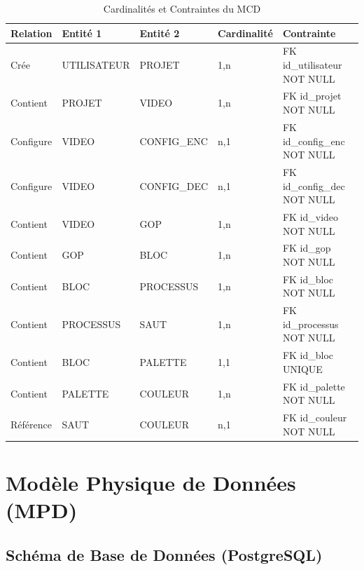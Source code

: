 \documentclass[12pt,a4paper]{article}
\begin{document}
	\begin{table}[h]
		\centering
		\caption{Cardinalités et Contraintes du MCD}
		\label{tab:cardinalites}
		\begin{tabular}{@{}lllll@{}}
			\toprule
			\textbf{Relation} & \textbf{Entité 1} & \textbf{Entité 2} & \textbf{Cardinalité} & \textbf{Contrainte} \\
			\midrule
			Crée & UTILISATEUR & PROJET & 1,n & FK id\_utilisateur NOT NULL \\
			Contient & PROJET & VIDEO & 1,n & FK id\_projet NOT NULL \\
			Configure & VIDEO & CONFIG\_ENC & n,1 & FK id\_config\_enc NOT NULL \\
			Configure & VIDEO & CONFIG\_DEC & n,1 & FK id\_config\_dec NOT NULL \\
			Contient & VIDEO & GOP & 1,n & FK id\_video NOT NULL \\
			Contient & GOP & BLOC & 1,n & FK id\_gop NOT NULL \\
			Contient & BLOC & PROCESSUS & 1,n & FK id\_bloc NOT NULL \\
			Contient & PROCESSUS & SAUT & 1,n & FK id\_processus NOT NULL \\
			Contient & BLOC & PALETTE & 1,1 & FK id\_bloc UNIQUE \\
			Contient & PALETTE & COULEUR & 1,n & FK id\_palette NOT NULL \\
			Référence & SAUT & COULEUR & n,1 & FK id\_couleur NOT NULL \\
			\bottomrule
		\end{tabular}
	\end{table}
	
	\section{Modèle Physique de Données (MPD)}
	\label{sec:mpd}
	
	\subsection{Schéma de Base de Données (PostgreSQL)}
	\label{subsec:schema_bdd}
	
\end{document}

